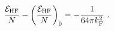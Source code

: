 \begin{equation}
\frac{{\cal E}_{\rm HF}}{N}-\left( \frac{{\cal E}_{\rm HF}}{N} \right)_0 = - \frac{1}{64 \pi k_{\rm F}^2} \ .
\label{d19}
\end{equation}

